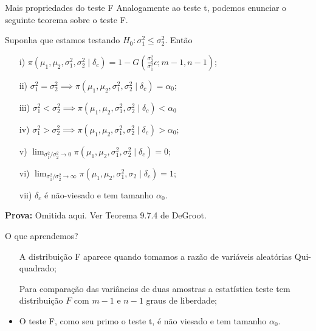   \begin{frame}{Mais propriedades do teste F}
 Analogamente ao teste t, podemos enunciar o seguinte teorema sobre o teste F.
 \begin{theo}
 \label{thm:F_test_properties}
 Suponha que estamos testando $H_0: \sigma_1^2 \leq \sigma_2^2$.
 Então
 \begin{itemize}
 \item [i)] $\pi(\mu_1, \mu_2, \sigma_1^2, \sigma_2^2 \mid \delta_c) = 1 -G\left(\frac{\sigma_2^2}{\sigma_1^2}c; m-1, n-1\right)$;
 \item [ii)] $\sigma_1^2 = \sigma_2^2 \implies \pi(\mu_1, \mu_2, \sigma_1^2, \sigma_2^2 \mid \delta_c) = \alpha_0$;
 \item [iii)] $\sigma_1^2 < \sigma_2^2 \implies \pi(\mu_1, \mu_2, \sigma_1^2, \sigma_2^2 \mid \delta_c) < \alpha_0$
 \item [iv)] $\sigma_1^2 > \sigma_2^2 \implies \pi(\mu_1, \mu_2, \sigma_1^2, \sigma_2^2 \mid \delta_c) > \alpha_0$;
 \item [v)] $\lim_{\sigma_1^2/\sigma_2^2 \to 0} \pi(\mu_1, \mu_2, \sigma_1^2, \sigma_2^2 \mid \delta_c) = 0$;
 \item [vi)] $\lim_{\sigma_1^2/\sigma_2^2 \to \infty} \pi(\mu_1, \mu_2, \sigma_1^2, \sigma_2 \mid \delta_c) = 1$;
 \item[vii)] $\delta_c$ é não-viesado e tem tamanho $\alpha_0$.
\end{itemize}
\end{theo}
\textbf{Prova:} Omitida aqui. 
Ver Teorema 9.7.4 de DeGroot.  
 \end{frame}
 
\begin{frame}{O que aprendemos?}
\begin{itemize}
  \item[\faLightbulbO] A distribuição F aparece quando tomamos a razão de variáveis aleatórias Qui-quadrado;    
  \item[\faLightbulbO] Para comparação das variâncias de duas amostras a estatística teste tem distribuição $F$ com $m-1$ e $n-1$ graus de liberdade; 
  \item O teste F, como seu primo o teste t, é não viesado e tem tamanho $\alpha_0$.
   \end{itemize}
 \end{frame} 
 
